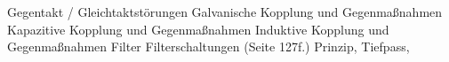 Gegentakt / Gleichtaktstörungen
Galvanische Kopplung und Gegenmaßnahmen
Kapazitive Kopplung und Gegenmaßnahmen
Induktive Kopplung und Gegenmaßnahmen
Filter
Filterschaltungen (Seite 127f.)
Prinzip, Tiefpass, 
\begin{comment}
\section{Transducer}
Um die elektrische Energie in mechanische Energie und umgekehrt zu wandeln wird ein Transducer benötigt, welches gleichzeitig das Kernstück der Ultraschallsonographie darstellt.\\
Dieser besteht wie in \autoref{Abkuerzungen} gezeigt aus einen oder mehreren Piezoelementen mit der dazugehörigen matching-Schicht für die verbesserte Fokussierung. Da die longitudinal Wellen auf beiden Seiten eines Piezoelementes entstehen, müssen die Wellen auf der Rückseite der Sonde absorbiert werden um Reflektionen zu vermeiden. Dies geschieht durch einen einen akustischen Absorber und einen \textbf{backing block}. Zudem muss die Sonde vor \ac{emi} Störungen geschützt werden, da das Piezoelement auf einstrahlende Frequenzen reagieren kann. Dies geschieht durch ein geschirmtes Metallgehäuse welches an der Messstation geerdet ist und somit die Störungen ableiten kann.\\
Für die Bestimmung der Arbeitsfrequenz $f_0$ kann grundlegend gesagt werden, dass die genierten Frequenzen umgekehrt proportional zur Dicke des Piezoelementes $l_{piezo}$ ist. Um möglichst viel Energie effektiv umwandeln zu können, wird das Piezoelement bei möglichst geringer Impedanz betrieben wobei die Phasenverschiebung 0$^\circ$ beträgt und somit eine reine reelle Last getrieben wird. Dabei ist zu beachten, dass das Element schnellstmöglich ein- und ausschwingen soll, wodurch es am besten in Resonanz betrieben wird. Laut \ref{Abkuerzungen} vibriert ein Piezoelement in Resonanz, wenn die Dicke $l_{piezo}$ gleich $1/2\lambda$ ist, wodurch sich folgende Formel für die Bestimmung der Arbeitsfrequenz $f_0$ eines Piezoelementes aufstellen lässt.
\begin{align}
l_{piezo}&=\frac{1}{2}\lambda =\frac{1}{2} \frac{c}{f_0}\\
f_0&=\frac{c}{2\cdot l_{piezo}}
\end{align}
\subsection*{Kristall-Impedanz-Matching}
Nachdem die zu emittierende Frequenz und somit die Kristalldicke definiert wurde, muss anhand des Impedanz-Frequenz-Diagrammes des ausgewählten Kristalls eine Impedanzanpassung durchgeführt werden. Dieser Schritt ist nötig, da das Schleifen der Kristalle Fertigungstoleranzen unterliegt, und somit nicht genau auf die zu emittierende Frequenz geschliffen werden können. Nachfolgende Gleichung  wird für die Parallelabstimmung genutzt und mit dieser die parallele Induktivität $L_{par}$ bestimmt, wodurch die Breitbandigkeit des Kristalls erhöht wird.
\[L_{par}=\dfrac{1}{\omega_s^2\cdot C_0}\ mit\ \omega_s=2\pi f_s \]
Bild-Ersatzschaltbild RCL || $C_0$ + Bild-Impedanzkurve


\end{comment}
